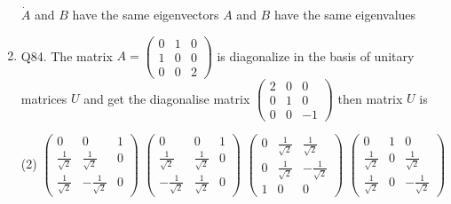 \begin{enumerate}
\begin{tasks}
  	\task[\textbf{c.}]$\dot{A}$ and $B$ have the same eigenvectors
  	\task[\textbf{d.}] $A$ and $B$ have the same eigenvalues
  \end{tasks}   
\item Q84. The matrix $A=\left(\begin{array}{lll}0 & 1 & 0 \\ 1 & 0 & 0 \\ 0 & 0 & 2\end{array}\right)$ is diagonalize in the basis of unitary matrices $U$ and get the diagonalise matrix $\left(\begin{array}{ccc}2 & 0 & 0 \\ 0 & 1 & 0 \\ 0 & 0 & -1\end{array}\right)$ then matrix $U$ is     
 \begin{tasks}(2)
	\task[\textbf{a.}]$\left(\begin{array}{ccc}0 & 0 & 1 \\ \frac{1}{\sqrt{2}} & \frac{1}{\sqrt{2}} & 0 \\ \frac{1}{\sqrt{2}} & -\frac{1}{\sqrt{2}} & 0\end{array}\right)$
	\task[\textbf{b.}]$\left(\begin{array}{ccc}0 & 0 & 1 \\ \frac{1}{\sqrt{2}} & \frac{1}{\sqrt{2}} & 0 \\ -\frac{1}{\sqrt{2}} & \frac{1}{\sqrt{2}} & 0\end{array}\right)$
	\task[\textbf{c.}]$\left(\begin{array}{ccc}0 & \frac{1}{\sqrt{2}} & \frac{1}{\sqrt{2}} \\ 0 & \frac{1}{\sqrt{2}} & -\frac{1}{\sqrt{2}} \\ 1 & 0 & 0\end{array}\right)$
	\task[\textbf{d.}] $\left(\begin{array}{ccc}0 & 1 & 0 \\ \frac{1}{\sqrt{2}} & 0 & \frac{1}{\sqrt{2}} \\ \frac{1}{\sqrt{2}} & 0 & -\frac{1}{\sqrt{2}}\end{array}\right)$
\end{tasks}     
     
     
     
     
     
     
     
     
\end{enumerate}
